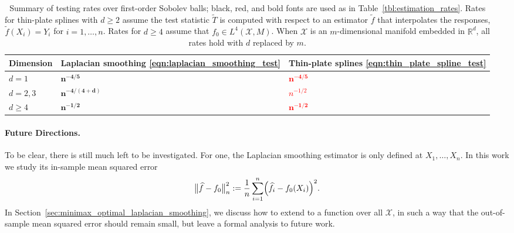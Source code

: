 \documentclass[twoside]{article}
\newcommand{\Reals}{\mathbb{R}}
\newcommand{\1}{\mathbf{1}}
\newcommand{\Rd}{\Reals^d}
\newcommand{\Xset}{\mathcal{X}}
\newcommand{\Leb}{L}
\newcommand{\wt}[1]{\widetilde{#1}}
\newcommand{\wh}[1]{\widehat{#1}}
\theoremstyle{definition}
\theoremstyle{remark}
\begin{document}
\begin{table}
	\begin{center}
		\begin{tabular}{p{} | p{} p{} }
			Dimension & Laplacian smoothing \eqref{eqn:laplacian_smoothing_test} & Thin-plate splines \eqref{eqn:thin_plate_spline_test} \\
			\hline
			$d = 1$ & $\bm{n^{-4/5}}$ & \textcolor{red}{$\bm{n^{-4/5}}$} \\
			$d = 2,3$ & $\bm{n^{-4/(4 + d)}}$ & \textcolor{red}{$n^{-1/2}$} \\
			$d \geq 4$ & $\bm{n^{-1/2}}$ & \textcolor{red}{$\bm{n^{-1/2}}$}
		\end{tabular}
	\end{center}
	\caption{Summary of testing rates over first-order Sobolev balls; black, red, and bold fonts are used as in Table~\ref{tbl:estimation_rates}. Rates for thin-plate splines with $d \geq 2$ assume the test statistic $\wt{T}$ is computed with respect to an estimator $\wt{f}$ that interpolates the responses, $\wt{f}(X_i) = Y_i$ for $i = 1,\ldots,n$.  Rates for $d \geq 4$ assume that $f_0 \in \Leb^4(\Xset,M)$. When $\Xset$ is an $m$-dimensional manifold embedded in $\Rd$, all rates hold with $d$ replaced by $m$.}
	\label{tbl:testing_rates}
\end{table}

\paragraph{Future Directions.} 

To be clear, there is still much left to be investigated. For one, the Laplacian smoothing estimator \smash{$\wh{f}$} is only defined at $X_1,\ldots,X_n$. In this work we study its in-sample mean squared error 
\begin{equation}
\label{eqn:empirical_norm_error}
\bigl\|\wh{f} - f_0\bigr\|_n^2 := \frac{1}{n}\sum_{i = 1}^{n} \Bigl(\wh{f}_i - f_0(X_i)\Bigr)^2.
\end{equation}
In Section~\ref{sec:minimax_optimal_laplacian_smoothing}, we discuss how to extend \smash{$\wh{f}$} to a function over all $\Xset$, in such a way that the out-of-sample mean squared error \smash{$\|\wh{f} - f_0\|_{\Leb^2(\Xset)}^2$} should remain small, but leave a formal analysis to future work.
\end{document}
